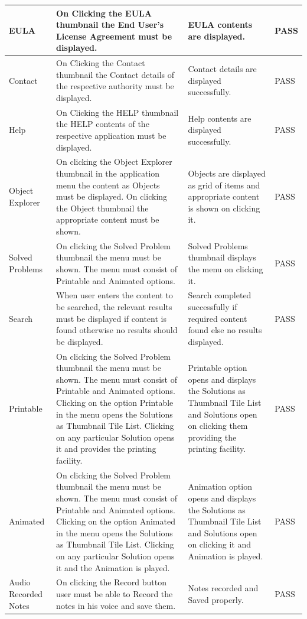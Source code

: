 \documentclass[openany,12pt]{report}
\begin{document}
\begin{longtable}{|p{3.5cm}|p{5cm}|p{3.5cm}|p{1.7cm}|}
EULA &On Clicking the EULA thumbnail the End User's License Agreement must be displayed. &EULA contents are displayed. &PASS \\\hline
Contact &On Clicking the Contact thumbnail the Contact details of the respective authority must be displayed. &Contact details are displayed successfully. &PASS \\\hline
Help &On Clicking the HELP thumbnail the HELP contents of the respective application must be displayed. &Help contents are displayed successfully. &PASS \\\hline
Object Explorer &On clicking the Object Explorer thumbnail in the application menu the content as Objects must be displayed. On clicking the Object thumbnail the appropriate content must be shown. &Objects are displayed as grid of items and appropriate content is shown on clicking it.  &PASS \\\hline
Solved Problems &On clicking the Solved Problem thumbnail the menu must be shown. The menu must consist of Printable and Animated options. &Solved Problems thumbnail displays the menu on clicking it. &PASS \\\hline
Search &When user enters the content to be searched, the relevant results must be displayed if content is found otherwise no results should be displayed. &Search completed  successfully if required content found else no results displayed. &PASS \\\hline
Printable &On clicking the Solved Problem thumbnail the menu must be shown. The menu must consist of Printable and Animated options. Clicking on the option Printable in the menu opens the Solutions as Thumbnail Tile List. Clicking on any particular Solution opens it and provides the printing facility. &Printable option opens and displays the Solutions as Thumbnail Tile List and Solutions open on clicking them providing the printing facility. &PASS \\\hline
Animated &On clicking the Solved Problem thumbnail the menu must be shown. The menu must consist of Printable and Animated options. Clicking on the option Animated in the menu opens the Solutions as Thumbnail Tile List. Clicking on any particular Solution opens it and the Animation is played. &Animation option opens and displays the Solutions as Thumbnail Tile List and Solutions open on clicking it and Animation is played. &PASS \\\hline
Audio Recorded Notes &On clicking the Record button user must be able to Record the notes in his voice and save them. &Notes recorded and Saved properly. &PASS \\\hline

\end{longtable}
\end{document}
